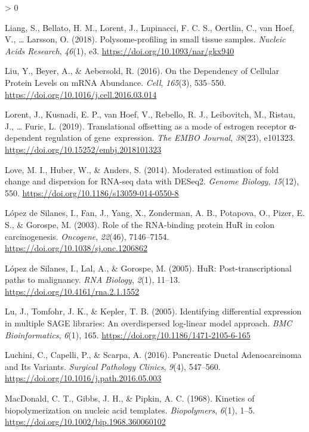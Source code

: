 \documentclass[
  12pt,
  openany]{book}
\newlength{\cslhangindent}
\newenvironment{CSLReferences}[2] %
 {%
  \setlength{\parindent}{0pt}
  \ifodd #1 \everypar{\setlength{\hangindent}{\cslhangindent}}\ignorespaces\fi
  \ifnum #2 > 0
  \setlength{\parskip}{#2\baselineskip}
  \fi
 }%
 {}
\begin{document}
\begin{CSLReferences}{1}{0}
\leavevmode\hypertarget{ref-Liang2018}{}%
Liang, S., Bellato, H. M., Lorent, J., Lupinacci, F. C. S., Oertlin, C., van Hoef, V., \ldots{} Larsson, O. (2018). Polysome-profiling in small tissue samples. \emph{Nucleic Acids Research}, \emph{46}(1), e3. \url{https://doi.org/10.1093/nar/gkx940}

\leavevmode\hypertarget{ref-Liu2016}{}%
Liu, Y., Beyer, A., \& Aebersold, R. (2016). On the {Dependency} of {Cellular Protein Levels} on {mRNA Abundance}. \emph{Cell}, \emph{165}(3), 535--550. \url{https://doi.org/10.1016/j.cell.2016.03.014}

\leavevmode\hypertarget{ref-Lorent2019}{}%
Lorent, J., Kusnadi, E. P., van Hoef, V., Rebello, R. J., Leibovitch, M., Ristau, J., \ldots{} Furic, L. (2019). Translational offsetting as a mode of estrogen receptor α-dependent regulation of gene~expression. \emph{The EMBO Journal}, \emph{38}(23), e101323. \url{https://doi.org/10.15252/embj.2018101323}

\leavevmode\hypertarget{ref-Love2014}{}%
Love, M. I., Huber, W., \& Anders, S. (2014). Moderated estimation of fold change and dispersion for {RNA}-seq data with {DESeq2}. \emph{Genome Biology}, \emph{15}(12), 550. \url{https://doi.org/10.1186/s13059-014-0550-8}

\leavevmode\hypertarget{ref-LopezdeSilanes2003}{}%
López de Silanes, I., Fan, J., Yang, X., Zonderman, A. B., Potapova, O., Pizer, E. S., \& Gorospe, M. (2003). Role of the {RNA}-binding protein {HuR} in colon carcinogenesis. \emph{Oncogene}, \emph{22}(46), 7146--7154. \url{https://doi.org/10.1038/sj.onc.1206862}

\leavevmode\hypertarget{ref-LopezdeSilanes2005}{}%
López de Silanes, I., Lal, A., \& Gorospe, M. (2005). {HuR}: Post-transcriptional paths to malignancy. \emph{RNA Biology}, \emph{2}(1), 11--13. \url{https://doi.org/10.4161/rna.2.1.1552}

\leavevmode\hypertarget{ref-Lu2005}{}%
Lu, J., Tomfohr, J. K., \& Kepler, T. B. (2005). Identifying differential expression in multiple {SAGE} libraries: An overdispersed log-linear model approach. \emph{BMC Bioinformatics}, \emph{6}(1), 165. \url{https://doi.org/10.1186/1471-2105-6-165}

\leavevmode\hypertarget{ref-Luchini2016}{}%
Luchini, C., Capelli, P., \& Scarpa, A. (2016). Pancreatic {Ductal Adenocarcinoma} and {Its Variants}. \emph{Surgical Pathology Clinics}, \emph{9}(4), 547--560. \url{https://doi.org/10.1016/j.path.2016.05.003}

\leavevmode\hypertarget{ref-MacDonald1968}{}%
MacDonald, C. T., Gibbs, J. H., \& Pipkin, A. C. (1968). Kinetics of biopolymerization on nucleic acid templates. \emph{Biopolymers}, \emph{6}(1), 1--5. \url{https://doi.org/10.1002/bip.1968.360060102}


\end{CSLReferences}
\end{document}
